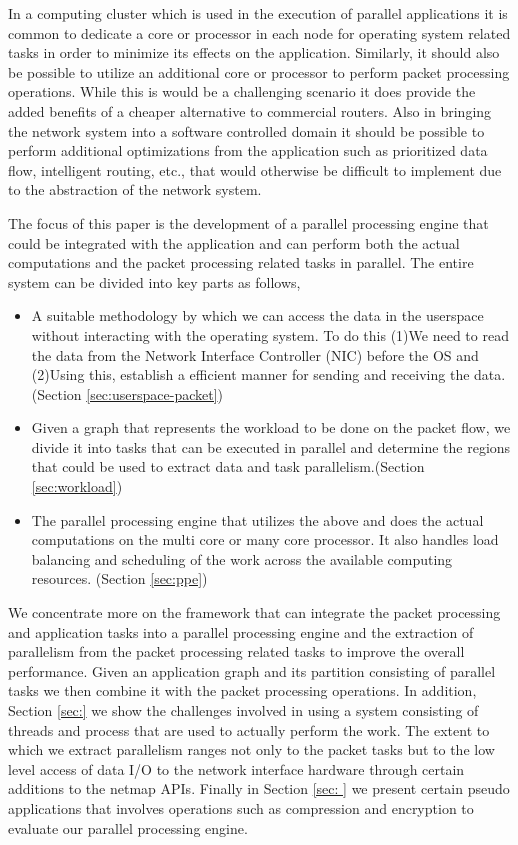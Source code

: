 \documentclass[conference]{IEEEtran}
\begin{document}
In a computing cluster which is used in the execution of parallel applications it is common to dedicate a core or processor in each node for operating system related tasks in order to minimize its effects on the application. Similarly, it should also be possible to utilize an additional core or processor to perform packet processing operations. While this is would be a challenging scenario it does provide the added benefits of a cheaper alternative to commercial routers. Also in bringing the network system into a software controlled domain it should be possible to perform additional optimizations from the application such as prioritized data flow, intelligent routing, etc., that would otherwise be difficult to implement due to the abstraction of the network system. 

The focus of this paper is the development of a parallel processing engine that could be integrated with the application and can perform both the actual computations and the packet processing related tasks in parallel. The entire system can be divided into key parts as follows,

\begin{itemize}

\item A suitable methodology by which we can access the data in the userspace without interacting with the operating system. To do this (1)We need to read the data from the Network Interface Controller (NIC) before the OS and (2)Using this, establish a efficient manner for sending and receiving the data.(Section \ref{sec:userspace-packet})

\item Given a graph that represents the workload to be done on the packet flow, we divide it into tasks that can be executed in parallel and determine the regions that could be used to extract data and task parallelism.(Section \ref{sec:workload})

\item The parallel processing engine that utilizes the above and does the actual computations on the multi core or many core processor. It also handles load balancing and scheduling of the work across the available computing resources. (Section \ref{sec:ppe})

\end{itemize} 

We concentrate more on the framework that can integrate the packet processing and application tasks into a parallel processing engine and the extraction of parallelism from the packet processing related tasks to improve the overall performance. Given an application graph and its partition consisting of parallel tasks we then combine it with the packet processing operations. In addition, Section \ref{sec:} we show the challenges involved in using a system consisting of threads and process that are used to actually perform the work. The extent to which we extract parallelism ranges not only to the packet tasks but to the low level access of data I/O to the network interface hardware through certain additions to the netmap APIs. Finally in Section \ref{sec: } we present certain pseudo applications that involves operations such as compression and encryption to evaluate our parallel processing engine. 
 
\end{document}
